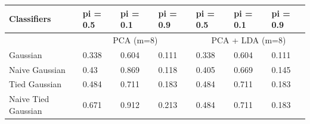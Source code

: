 \documentclass[letterpaper, italian]{article}
\begin{document}
    \begin{table}[]
        \centering
        \begin{tabular}{@{}lllllll@{}}
        \hline
        Classifiers         & pi = 0.5 & pi = 0.1 & pi = 0.9 & pi = 0.5   & pi = 0.1   & pi = 0.9  \\ \hline
                            & \multicolumn{3}{c}{PCA (m=8)}  & \multicolumn{3}{c}{PCA + LDA (m=8)} \\
        Gaussian            & 0.338    & 0.604    & 0.111    & 0.338      & 0.604      & 0.111     \\
        Naive Gaussian      & 0.43     & 0.869    & 0.118    & 0.405      & 0.669      & 0.145     \\
        Tied Gaussian       & 0.484    & 0.711    & 0.183    & 0.484      & 0.711      & 0.183     \\
        Naive Tied Gaussian & 0.671    & 0.912    & 0.213    & 0.484      & 0.711      & 0.183     \\ \hline
        \end{tabular}\label{tab:table3}
    \end{table}
\end{document}
